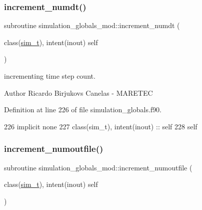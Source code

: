 \subsubsection{\texorpdfstring{increment\+\_\+numdt()}{increment\_numdt()}}
{\footnotesize\ttfamily subroutine simulation\+\_\+globals\+\_\+mod\+::increment\+\_\+numdt (\begin{DoxyParamCaption}\item[{class(\mbox{\hyperlink{structsimulation__globals__mod_1_1sim__t}{sim\+\_\+t}}), intent(inout)}]{self }\end{DoxyParamCaption})\hspace{0.3cm}{\ttfamily [private]}}



incrementing time step count. 

\begin{DoxyAuthor}{Author}
Ricardo Birjukovs Canelas -\/ M\+A\+R\+E\+T\+EC 
\end{DoxyAuthor}


Definition at line 226 of file simulation\+\_\+globals.\+f90.


\begin{DoxyCode}
226     \textcolor{keywordtype}{implicit none}
227     \textcolor{keywordtype}{class}(sim\_t), \textcolor{keywordtype}{intent(inout)} :: self
228     self%
\end{DoxyCode}
\mbox{\label{namespacesimulation__globals__mod_a3f685028fd342cb9525599e00f04c7a6}} 
\subsubsection{\texorpdfstring{increment\+\_\+numoutfile()}{increment\_numoutfile()}}
{\footnotesize\ttfamily subroutine simulation\+\_\+globals\+\_\+mod\+::increment\+\_\+numoutfile (\begin{DoxyParamCaption}\item[{class(\mbox{\hyperlink{structsimulation__globals__mod_1_1sim__t}{sim\+\_\+t}}), intent(inout)}]{self }\end{DoxyParamCaption})\hspace{0.3cm}{\ttfamily [private]}}



